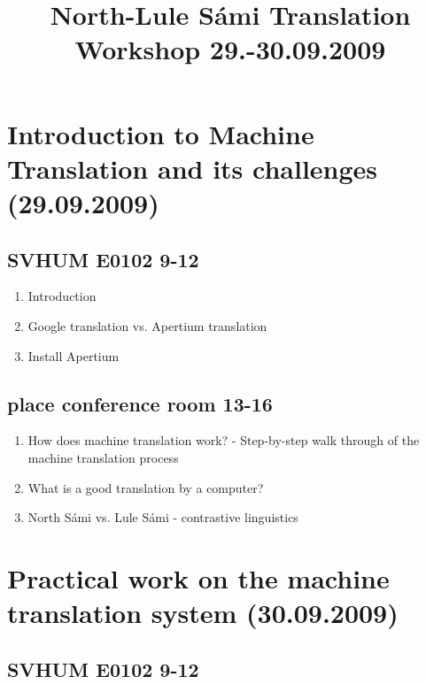 \documentclass[a4paper,english,12pt]{article}
\begin{document}
\setcounter{secnumdepth}{3}
\setcounter{tocdepth}{3}
\begin{spacing}{1.0}


\newcommand{\tx}{\mbox{t\hspace{-.35em}-}} %




\title{{\Large North-Lule Sámi Translation Workshop 29.-30.09.2009}}

\maketitle

\section{Introduction to Machine Translation and its challenges (29.09.2009)}


\subsection{SVHUM E0102 9-12}
\begin{enumerate}
\item Introduction
\item Google translation vs. Apertium translation
\item Install Apertium %
\end{enumerate}

\subsection{place conference room 13-16}

\begin{enumerate}
\item How does machine translation work? - Step-by-step walk through of the machine translation process%
\item What is a good translation by a computer?
\item North Sámi vs. Lule Sámi - contrastive linguistics
\end{enumerate}


\section{Practical work on the machine translation system (30.09.2009)}

\subsection{SVHUM E0102 9-12}


\end{spacing}
\end{document}
